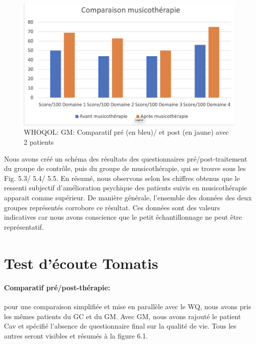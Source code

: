  \begin{figure}[th]
 	\centering
 	\includegraphics[width=1.0\linewidth]{images/Compmusico.png}
 	\caption[Schéma du déroulement]{ WHOQOL: GM: Comparatif pré (en bleu)/ et post (en jaune) avec 2 
 	patients}
 	
 \end{figure}
 
 
 Nous avons créé un schéma des résultats des questionnaires
 pré/post-traitement du groupe de contrôle, puis du groupe de musicothérapie,
 qui  se trouve sous les Fig. 5.3/ 5.4/ 5.5.
 En résumé, nous observons selon les chiffres obtenus que  le ressenti
 subjectif d'amélioration psychique
 des patients suivis en musicothérapie apparait comme
 supérieur.
 De manière générale, l'ensemble des données des deux groupes représentés
 corrobore ce résultat.
 Ces données sont des valeurs indicatives car nous avons conscience que le petit échantillonnage ne
 peut être représentatif.

 
 \clearpage

 \section{Test d'écoute Tomatis\textsuperscript \textregistered }
  \paragraph{Comparatif pré/post-thérapie:}
 pour une comparaison simplifiée et mise en parallèle avec le WQ, nous avons pris les mêmes   
 patients du GC et du GM. Avec GM, nous avons rajouté  le patient Cav et spécifié l'absence de 
 questionnaire final sur la qualité de vie.
 Tous les autres seront visibles et résumés à la figure 6.1.
